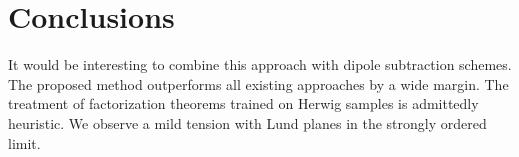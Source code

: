\section{Conclusions}\label{sec:conclusions}

It would be interesting to combine this approach with dipole subtraction
schemes. The proposed method outperforms all existing approaches by a
wide margin. The treatment of factorization theorems trained on Herwig
samples is admittedly heuristic. We observe a mild tension with Lund
planes in the strongly ordered limit.

